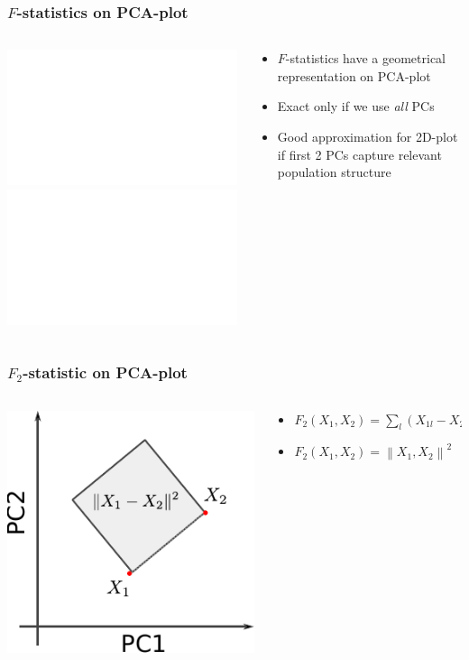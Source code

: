 \documentclass[11pt]{beamer}
\newcommand{\normsq}[1]{\left\lVert#1\right\rVert^2}
\begin{document}
\begin{frame}
\frametitle{$F$-statistics on PCA-plot}
\begin{columns}
	\begin{column}{0.5\textwidth}
		\includegraphics<1>{figures/pca1.pdf}
		\includegraphics<2->{figures/pca1b.pdf}		
	\end{column}
	\begin{column}{0.5\textwidth}
		\begin{itemize}
			\item<3-> $F$-statistics have a geometrical representation on PCA-plot
			\item<3-> Exact only if we use \emph{all} PCs
			\item<4-> Good approximation for 2D-plot if first 2 PCs capture relevant population structure
		\end{itemize}		
	\end{column}
\end{columns}
\end{frame}

\begin{frame}
\frametitle{$F_2$-statistic on PCA-plot}
\begin{columns}
	\begin{column}{0.5\textwidth}
		\includegraphics{figures/f2_on_pca.pdf}
	\end{column}
	\begin{column}{0.5\textwidth}
		\begin{itemize}
			\item $F_2(X_1, X_2) = \sum_l(X_{1l}-X_{2l})^2$
			\item $F_2(X_1, X_2) = \normsq{X_1, X_2}$			
		\end{itemize}		
	\end{column}
\end{columns}
\end{frame}
\end{document}
